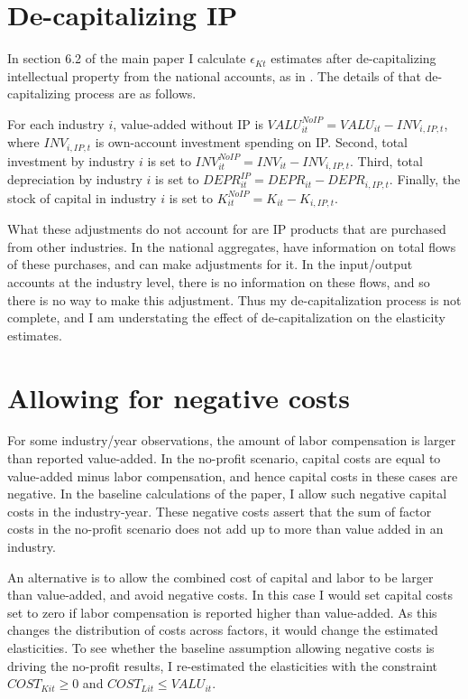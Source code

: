 \documentclass[11pt]{article}
\begin{document}
\section{De-capitalizing IP}
In section 6.2 of the main paper I calculate $\epsilon_{Kt}$ estimates after de-capitalizing intellectual property from the national accounts, as in \cite{ksz2020}. The details of that de-capitalizing process are as follows.

For each industry $i$, value-added without IP is $VALU_{it}^{NoIP} = VALU_{it} - INV_{i,IP,t}$, where $INV_{i,IP,t}$ is own-account investment spending on IP. Second, total investment by industry $i$ is set to $INV_{it}^{NoIP} = INV_{it} - INV_{i,IP,t}$. Third, total depreciation by industry $i$ is set to $DEPR_{it}^{IP} = DEPR_{it} - DEPR_{i,IP,t}$. Finally, the stock of capital in industry $i$ is set to $K^{NoIP}_{it} = K_{it} - K_{i,IP,t}$. 

What these adjustments do not account for are IP products that are purchased from other industries. In the national aggregates, \cite{ksz2020} have information on total flows of these purchases, and can make adjustments for it. In the input/output accounts at the industry level, there is no information on these flows, and so there is no way to make this adjustment. Thus my de-capitalization process is not complete, and I am understating the effect of de-capitalization on the elasticity estimates.

\section{Allowing for negative costs}
For some industry/year observations, the amount of labor compensation is larger than reported value-added. In the no-profit scenario, capital costs are equal to value-added minus labor compensation, and hence capital costs in these cases are negative. In the baseline calculations of the paper, I allow such negative capital costs in the industry-year. These negative costs assert that the sum of factor costs in the no-profit scenario does not add up to more than value added in an industry. 

An alternative is to allow the combined cost of capital and labor to be larger than value-added, and avoid negative costs. In this case I would set capital costs set to zero if labor compensation is reported higher than value-added. As this changes the distribution of costs across factors, it would change the estimated elasticities. To see whether the baseline assumption allowing negative costs is driving the no-profit results, I re-estimated the elasticities with the constraint $COST_{Kit} \geq 0$ and $COST_{Lit} \leq VALU_{it}$.
\end{document}
